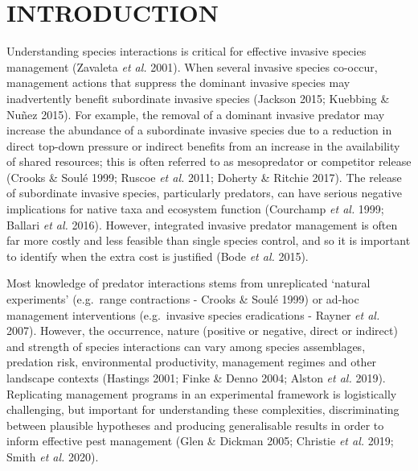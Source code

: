 \documentclass[]{elsarticle} %
\begin{document}
\newpage

\hypertarget{introduction}{%
\section{INTRODUCTION}\label{introduction}}

Understanding species interactions is critical for effective invasive species management (Zavaleta \emph{et al.} 2001). When several invasive species co-occur, management actions that suppress the dominant invasive species may inadvertently benefit subordinate invasive species (Jackson 2015; Kuebbing \& Nuñez 2015). For example, the removal of a dominant invasive predator may increase the abundance of a subordinate invasive species due to a reduction in direct top-down pressure or indirect benefits from an increase in the availability of shared resources; this is often referred to as mesopredator or competitor release (Crooks \& Soulé 1999; Ruscoe \emph{et al.} 2011; Doherty \& Ritchie 2017). The release of subordinate invasive species, particularly predators, can have serious negative implications for native taxa and ecosystem function (Courchamp \emph{et al.} 1999; Ballari \emph{et al.} 2016). However, integrated invasive predator management is often far more costly and less feasible than single species control, and so it is important to identify when the extra cost is justified (Bode \emph{et al.} 2015).

Most knowledge of predator interactions stems from unreplicated `natural experiments' (e.g.~range contractions - Crooks \& Soulé 1999) or ad-hoc management interventions (e.g.~invasive species eradications - Rayner \emph{et al.} 2007). However, the occurrence, nature (positive or negative, direct or indirect) and strength of species interactions can vary among species assemblages, predation risk, environmental productivity, management regimes and other landscape contexts (Hastings 2001; Finke \& Denno 2004; Alston \emph{et al.} 2019). Replicating management programs in an experimental framework is logistically challenging, but important for understanding these complexities, discriminating between plausible hypotheses and producing generalisable results in order to inform effective pest management (Glen \& Dickman 2005; Christie \emph{et al.} 2019; Smith \emph{et al.} 2020).
\end{document}
